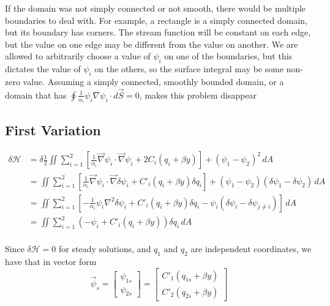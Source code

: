 \documentclass[12pt]{article}
\begin{document}
{{{            If the domain was not simply connected or not smooth, there would be multiple boundaries to deal with. For example, a rectangle is a simply connected domain, but its boundary has corners. The stream function will be constant on each edge, but the value on one edge may be different from the value on another. We are allowed to arbitrarily choose a value of $\psi_i$ on one of the boundaries, but this dictates the value of $\psi_i$ on the others, so the surface integral may be some non-zero value. Assuming a simply connected, smoothly bounded domain, or a domain that has $\oint \frac{1}{\alpha_i}\psi_i \nabla \psi_i\cdot d \vec S = 0$, makes this problem disappear
        }
    }

    \subsection{First Variation}{
        \begin{align*}
            \delta \mathcal{H} &= \delta \frac12 \iint \sum_{i=1}^2 \left[ \frac{1}{\alpha_i} \vec\nabla \psi_i \cdot \vec\nabla \psi_i + 2C_i(q_i + \beta y) \right]+ (\psi_1 - \psi_2)^2 \, dA \\
            &= \iint \sum_{i=1}^2 \left[ \frac{1}{\alpha_i} \vec\nabla \psi_i \cdot \vec\nabla \delta\psi_i + C'_i(q_i + \beta y) \delta q_i \right]+ (\psi_1 - \psi_2)(\delta \psi_1 - \delta \psi_2) \, dA \\
            &= \iint \sum_{i=1}^2 \left[ -\frac{1}{\alpha_i} \psi_i \nabla^2 \delta\psi_i + C'_i(q_i + \beta y) \delta q_i - \psi_i(\delta \psi_i - \delta \psi_{j \ne i}) \right] \, dA \\
            &= \iint \sum_{i=1}^2 (-\psi_i + C'_i(q_i + \beta y)) \delta q_i\, dA \\
        \end{align*}

        Since $\delta \mathcal{H} = 0$ for steady solutions, and $q_1$ and $q_2$ are independent coordinates, we have that in vector form
        \begin{equation}
            \vec \psi_s =
            \left[\begin{array}{c}
            \psi_{1s} \\
            \psi_{2s}
            \end{array}\right]
            =
            \left[\begin{array}{c}
            C'_1(q_{1s} + \beta y) \\
            C'_2(q_{2s} + \beta y)
            \end{array}\right]
        \end{equation}
    }

}
\end{document}
